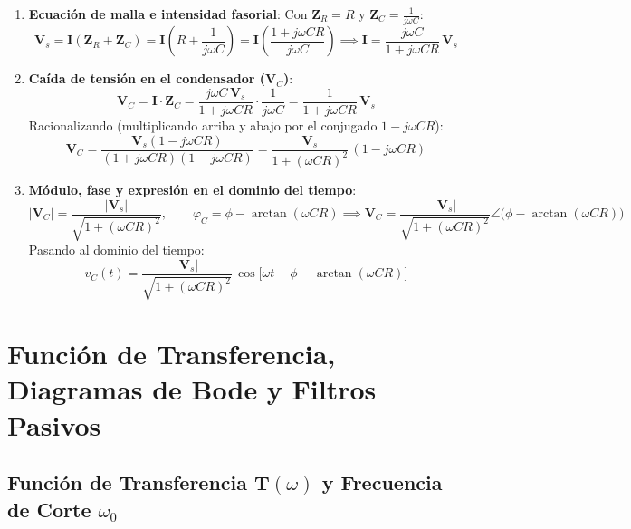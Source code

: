 \begin{enumerate}
    \item \textbf{Ecuación de malla e intensidad fasorial}: Con $\mathbf{Z}_R = R$ y $\mathbf{Z}_C = \frac{1}{j\omega C}$:
    \begin{equation}
        \mathbf{V}_s = \mathbf{I}(\mathbf{Z}_R + \mathbf{Z}_C) = \mathbf{I}\left(R + \frac{1}{j\omega C}\right) = \mathbf{I}\left(\frac{1 + j\omega C R}{j\omega C}\right) \implies \mathbf{I} = \frac{j\omega C}{1 + j\omega C R}\,\mathbf{V}_s
    \end{equation}
    \item \textbf{Caída de tensión en el condensador ($\mathbf{V}_C$)}:
    \begin{equation}
        \mathbf{V}_C = \mathbf{I}\cdot\mathbf{Z}_C = \frac{j\omega C\,\mathbf{V}_s}{1 + j\omega C R}\cdot\frac{1}{j\omega C} = \frac{1}{1 + j\omega C R}\,\mathbf{V}_s
    \end{equation}
    Racionalizando (multiplicando arriba y abajo por el conjugado $1 - j\omega C R$):
    \begin{equation}
        \mathbf{V}_C = \frac{\mathbf{V}_s(1 - j\omega C R)}{(1 + j\omega C R)(1 - j\omega C R)} = \frac{\mathbf{V}_s}{1 + (\omega C R)^2}\,(1 - j\omega C R)
    \end{equation}
    \item \textbf{Módulo, fase y expresión en el dominio del tiempo}:
    \begin{equation}
        |\mathbf{V}_C| = \frac{|\mathbf{V}_s|}{\sqrt{1 + (\omega C R)^2}}, \qquad \varphi_C = \phi - \arctan(\omega C R) \implies \mathbf{V}_C = \frac{|\mathbf{V}_s|}{\sqrt{1 + (\omega C R)^2}}\angle\big(\phi - \arctan(\omega C R)\big)
    \end{equation}
    Pasando al dominio del tiempo:
    \begin{equation}
        \boxed{v_C(t) = \frac{|\mathbf{V}_s|}{\sqrt{1 + (\omega C R)^2}}\,\cos\big[\omega t + \phi - \arctan(\omega C R)\big]}
    \end{equation}
\end{enumerate}

\section{Función de Transferencia, Diagramas de Bode y Filtros Pasivos}

\subsection{Función de Transferencia $\mathbf{T}(\omega)$ y Frecuencia de Corte $\omega_0$}

